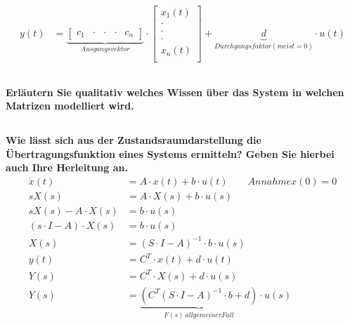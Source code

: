 \begin{equation}
\begin{aligned}
        y(t)    & =\underbrace{\left[\begin{array}{ccccc}
                    c_1 & \cdot & \cdot & \cdot & c_n
                \end{array}\right]}_{Ausgangsvektor}\cdot\left[
            \begin{array}{c}
                x_1(t) \\
                \cdot  \\
                \cdot  \\
                \cdot  \\
                x_n(t) \\
            \end{array}
            \right]+\underbrace{d}_{Durchgangsfaktor(meist=0)}\cdot u(t)
    \end{aligned}
\end{equation}

\subsection{}
\textbf{Erläutern Sie qualitativ welches Wissen über das System in welchen Matrizen modelliert wird.}

\subsection{}
\textbf{Wie lässt sich aus der Zustandsraumdarstellung die Übertragungsfunktion eines Systems ermitteln? Geben Sie hierbei auch Ihre Herleitung an.}
\begin{equation}
    \begin{aligned}
        \dot{x}(t)             & =A\cdot x(t)+b\cdot u(t)\qquad Annahme x(0)=0                                    \\
        sX(s)                  & =A\cdot X(s)+b\cdot u(s)                                                         \\
        sX(s)-A\cdot X(s)      & =b\cdot u(s)                                                                     \\
        (s\cdot I-A)\cdot X(s) & =b\cdot u(s)                                                                     \\
        X(s)                   & =(S\cdot I-A)^{-1}\cdot b\cdot u(s)                                              \\
        y(t)                   & =C^T\cdot x(t)+d\cdot u(t)                                                       \\
        Y(s)                   & =C^T\cdot X(s)+d\cdot u(s)                                                       \\
        Y(s)                   & =\underbrace{(C^T(S\cdot I-A)^{-1}\cdot b+d)}_{F(s)\ allgemeiner Fall}\cdot u(s)
    \end{aligned}
\end{equation}
